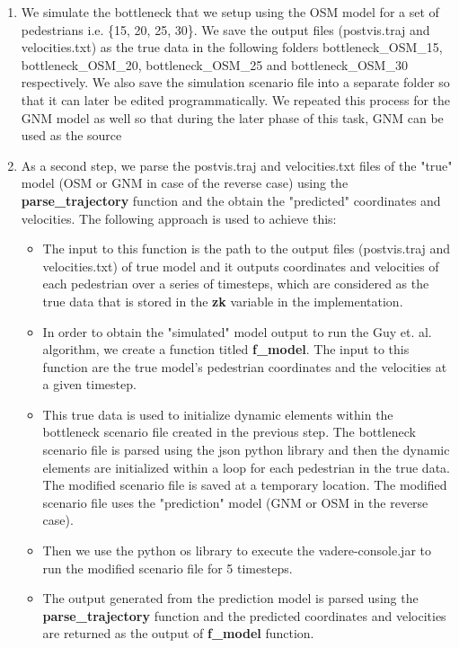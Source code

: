 \documentclass[10pt,a4paper]{article}
\begin{document}
\begin{enumerate}
	\item We simulate the bottleneck that we setup using the OSM model for a set of pedestrians i.e. \{15, 20, 25, 30\}. We save the output files (postvis.traj and velocities.txt) as the true data in the following folders bottleneck\_OSM\_15, bottleneck\_OSM\_20, bottleneck\_OSM\_25 and bottleneck\_OSM\_30 respectively. We also save the simulation scenario file into a separate folder so that it can later be edited programmatically. We repeated this process for the GNM model as well so that during the later phase of this task, GNM can be used as the source
	\item As a second step, we parse the postvis.traj and velocities.txt files of the "true" model (OSM or GNM in case of the reverse case) using the \textbf{parse\_trajectory} function and the obtain the "predicted" coordinates and velocities. The following approach is used to achieve this:
	\begin{itemize}
			\item The input to this function is the path to the output files (postvis.traj and velocities.txt) of true model and it outputs coordinates and velocities of each pedestrian over a series of timesteps, which are considered as the true data that is stored in the \textbf{zk} variable in the implementation. 
			\item In order to obtain the "simulated" model output to run the Guy et. al. algorithm, we create a function titled \textbf{f\_model}. The input to this function are the true model's pedestrian coordinates and the velocities at a given timestep.
			\item This true data is used to initialize dynamic elements within the bottleneck scenario file created in the previous step. The bottleneck scenario file is parsed using the json python library and then the dynamic elements are initialized within a loop for each pedestrian in the true data. The modified scenario file is saved at a temporary location. The modified scenario file uses the "prediction" model (GNM or OSM in the reverse case).
			\item Then we use the python os library to execute the vadere-console.jar to run the modified scenario file for 5 timesteps. 
			\item The output generated from the prediction model is parsed using the \textbf{parse\_trajectory} function and the predicted coordinates and velocities are returned as the output of \textbf{f\_model} function.
	\end{itemize}

\end{enumerate}
\end{document}
